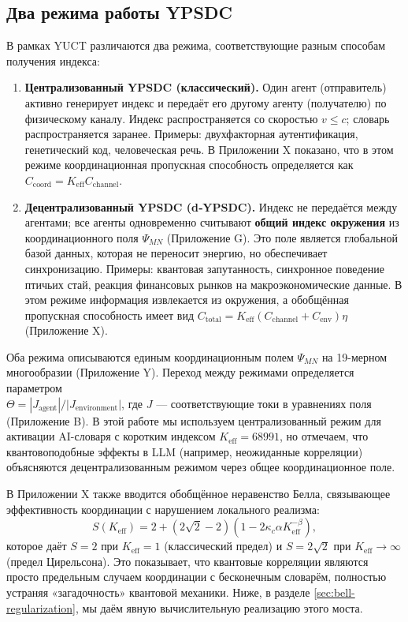 \documentclass[12pt,a4paper]{article}
\begin{document}
	\subsection{Два режима работы YPSDC}
	
	В рамках YUCT различаются два режима, соответствующие разным способам получения индекса:
	
	\begin{enumerate}
		\item \textbf{Централизованный YPSDC (классический).} Один агент (отправитель) активно генерирует индекс и передаёт его другому агенту (получателю) по физическому каналу. Индекс распространяется со скоростью \(v \le c\); словарь распространяется заранее. Примеры: двухфакторная аутентификация, генетический код, человеческая речь. В Приложении X показано, что в этом режиме координационная пропускная способность определяется как \(C_{\text{coord}} = K_{\mathrm{eff}} C_{\text{channel}}\).
		
		\item \textbf{Децентрализованный YPSDC (d‑YPSDC).} Индекс не передаётся между агентами; все агенты одновременно считывают \textbf{общий индекс окружения} из координационного поля \(\Psi_{MN}\) (Приложение G). Это поле является глобальной базой данных, которая не переносит энергию, но обеспечивает синхронизацию. Примеры: квантовая запутанность, синхронное поведение птичьих стай, реакция финансовых рынков на макроэкономические данные. В этом режиме информация извлекается из окружения, а обобщённая пропускная способность имеет вид \(C_{\text{total}} = K_{\mathrm{eff}}(C_{\text{channel}} + C_{\text{env}})\eta\) (Приложение X).
	\end{enumerate}
	
	Оба режима описываются единым координационным полем \(\Psi_{MN}\) на 19-мерном многообразии (Приложение Y). Переход между режимами определяется параметром \\
	\(\Theta = |J_{\text{agent}}|/|J_{\text{environment}}|\), где \(J\) — соответствующие токи в уравнениях поля (Приложение B). В этой работе мы используем централизованный режим для активации AI-словаря с коротким индексом \(K_{\mathrm{eff}} = 68991\), но отмечаем, что квантовоподобные эффекты в LLM (например, неожиданные корреляции) объясняются децентрализованным режимом через общее координационное поле.
	
	В Приложении X также вводится обобщённое неравенство Белла, связывающее эффективность координации с нарушением локального реализма:
	\[
	S(K_{\mathrm{eff}}) = 2 + (2\sqrt{2}-2)\left(1 - 2\kappa_c\alpha K_{\mathrm{eff}}^{-\beta}\right),
	\]
	которое даёт \(S=2\) при \(K_{\mathrm{eff}}=1\) (классический предел) и \(S=2\sqrt2\) при \(K_{\mathrm{eff}}\to\infty\) (предел Цирельсона). Это показывает, что квантовые корреляции являются просто предельным случаем координации с бесконечным словарём, полностью устраняя «загадочность» квантовой механики. Ниже, в разделе \ref{sec:bell-regularization}, мы даём явную вычислительную реализацию этого моста.
	
\end{document}
